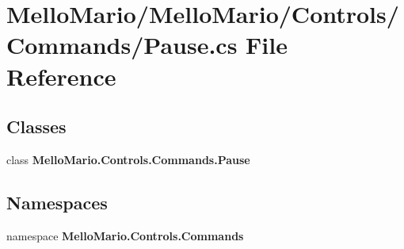 \section{Mello\+Mario/\+Mello\+Mario/\+Controls/\+Commands/\+Pause.cs File Reference}
\label{Pause_8cs}
\subsection*{Classes}
\begin{DoxyCompactItemize}
\item 
class \textbf{ Mello\+Mario.\+Controls.\+Commands.\+Pause}
\end{DoxyCompactItemize}
\subsection*{Namespaces}
\begin{DoxyCompactItemize}
\item 
namespace \textbf{ Mello\+Mario.\+Controls.\+Commands}
\end{DoxyCompactItemize}
